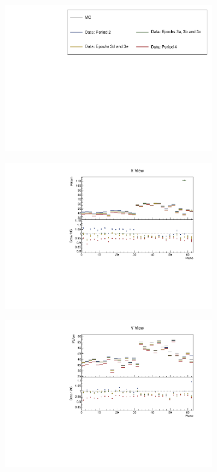 \documentclass[12pt,a4paper]{article}
\begin{document}
\begin{figure}[!ht]
  \begin{subfigure}{\textwidth}
  \centering
    \includegraphics[height=0.2\linewidth]{essentialsec_tb/legend.pdf}
  \end{subfigure}
  \vspace*{2mm}

  \begin{subfigure}{0.5\textwidth}
    \includegraphics[width=\linewidth]{essentialsec_tb/pecm_plane_x.pdf}
  \end{subfigure}
  \begin{subfigure}{0.5\textwidth}
    \includegraphics[width=\linewidth]{essentialsec_tb/pecm_plane_y.pdf}

\end{subfigure}
\end{figure}
\end{document}
